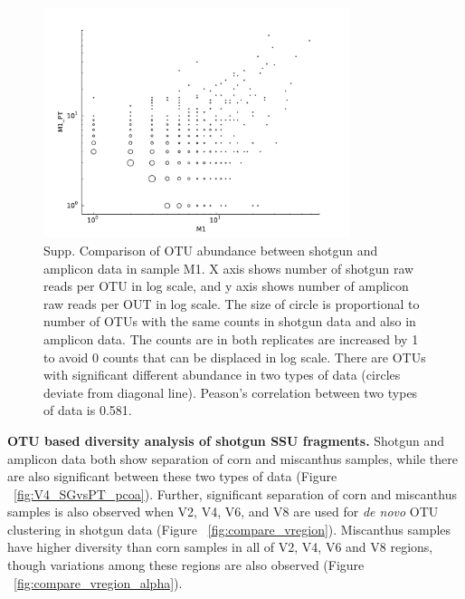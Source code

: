 \documentclass[12pt]{article}
\begin{document}
\begin{figure}[tbph!]
  \centering
  \includegraphics[width=0.8\textwidth]{figs/M1_SGvsPT_OTUscat}
  \caption[Comparison of OTU abundance between shotgun and amplicon data in sample M1. ]{Supp. Comparison of OTU abundance between shotgun and amplicon data in sample M1. X axis shows number of shotgun raw reads per OTU in log scale, and y axis shows number of amplicon raw reads per OUT in log scale. The size of circle is proportional to number of OTUs with the same counts in shotgun data and also in amplicon data. The counts are in both replicates are increased by 1 to avoid 0 counts that can be displaced in log scale. There are OTUs with significant different abundance in two types of data (circles deviate from diagonal line). Peason’s correlation between two types of data is 0.581.}
  \label{fig:M1_SGvsPT_OTUscat}
\end{figure}

  {\bf OTU based diversity analysis of shotgun SSU fragments. } 
Shotgun and amplicon data both show separation of corn and miscanthus samples, while there are also significant between these two types of data (Figure ~\ref{fig:V4_SGvsPT_pcoa}). Further, significant separation of corn and miscanthus samples is also observed when V2, V4, V6, and V8 are used for {\em de novo} OTU clustering in shotgun data (Figure ~\ref{fig:compare_vregion}). Miscanthus samples have higher diversity than corn samples in all of V2, V4, V6 and V8 regions, though variations among these regions are also observed (Figure ~\ref{fig:compare_vregion_alpha}).
\end{document}
